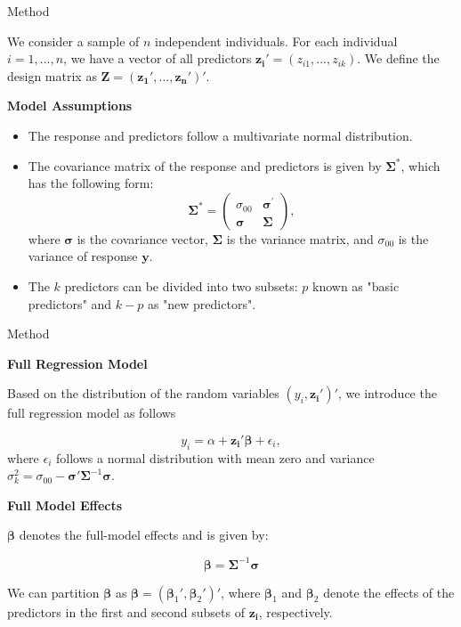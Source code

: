 \documentclass{beamer}
\begin{document}
\begin{frame}{Method}

We consider a sample of $n$ independent individuals. For each individual $i = 1, ..., n$, we have a vector of all predictors $\boldsymbol{z_i}' = (z_{i1},..., z_{ik})$. We define the design matrix as $\boldsymbol{Z} = (\boldsymbol{z_1}', ..., \boldsymbol{z_n}')'$.
\bigskip

\textbf{Model Assumptions}

\begin{itemize}
\item The response and predictors follow a multivariate normal distribution.
\item The covariance matrix of the response and predictors is given by ${\boldsymbol{\Sigma}^*}$, which has the following form:
$${\boldsymbol{\Sigma}^*} = \begin{pmatrix}
\sigma_{00} & \boldsymbol{\sigma^{'}} \\
\boldsymbol{\sigma} & \boldsymbol{\Sigma}
\end{pmatrix},$$
where $\boldsymbol{\sigma}$ is the covariance vector, $\boldsymbol{\Sigma}$ is the variance matrix, and $\sigma_{00}$ is the variance of response $\bm y$.
\item The $k$ predictors can be divided into two subsets: $p$ known as "basic predictors" and $k-p$ as "new predictors".
\end{itemize}

\end{frame}

\begin{frame}{Method}

\textbf{Full Regression Model}

Based on the distribution of the random variables $(y_i, \boldsymbol{z_i}')'$, we introduce the full regression model as follows

$$
y_i = \alpha + \boldsymbol{z_i}'\boldsymbol{\beta} + \epsilon_i,
$$
where $\epsilon_i$ follows a normal distribution with mean zero and variance $\sigma_k^2 = \sigma_{00} - \boldsymbol{\sigma}' \boldsymbol{\Sigma}^{-1} \boldsymbol{\sigma}$.

\bigskip

\textbf{Full Model Effects}

$\boldsymbol{\beta}$ denotes the full-model effects and is given by:

\begin{equation*}
\boldsymbol{\beta} = \boldsymbol{\Sigma}^{-1}\boldsymbol{\sigma}
\end{equation*}

We can partition $\boldsymbol{\beta}$ as $\boldsymbol{\beta} = (\boldsymbol{\beta}_1', \boldsymbol{\beta}_2')'$, where $\boldsymbol{\beta}_1$ and $\boldsymbol{\beta}_2$ denote the effects of the predictors in the first and second subsets of $\boldsymbol{z_i}$, respectively.

\end{frame}
\end{document}
